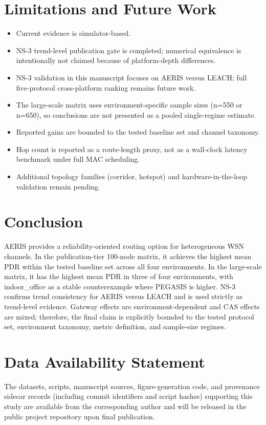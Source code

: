 \documentclass[sensors,article,submit,moreauthors,pdftex]{Definitions/mdpi}
\begin{document}
\section{Limitations and Future Work}
\begin{itemize}
\item Current evidence is simulator-based.
\item NS-3 trend-level publication gate is completed; numerical equivalence is intentionally not claimed because of platform-depth differences.
\item NS-3 validation in this manuscript focuses on AERIS versus LEACH; full five-protocol cross-platform ranking remains future work.
\item The large-scale matrix uses environment-specific sample sizes (n=550 or n=650), so conclusions are not presented as a pooled single-regime estimate.
\item Reported gains are bounded to the tested baseline set and channel taxonomy.
\item Hop count is reported as a route-length proxy, not as a wall-clock latency benchmark under full MAC scheduling.
\item Additional topology families (corridor, hotspot) and hardware-in-the-loop validation remain pending.
\end{itemize}

\section{Conclusion}
AERIS provides a reliability-oriented routing option for heterogeneous WSN channels. In the publication-tier 100-node matrix, it achieves the highest mean PDR within the tested baseline set across all four environments. In the large-scale matrix, it has the highest mean PDR in three of four environments, with indoor\_office as a stable counterexample where PEGASIS is higher. NS-3 confirms trend consistency for AERIS versus LEACH and is used strictly as trend-level evidence. Gateway effects are environment-dependent and CAS effects are mixed; therefore, the final claim is explicitly bounded to the tested protocol set, environment taxonomy, metric definition, and sample-size regimes.

\section*{Data Availability Statement}
The datasets, scripts, manuscript sources, figure-generation code, and provenance sidecar records (including commit identifiers and script hashes) supporting this study are available from the corresponding author and will be released in the public project repository upon final publication.


\end{document}
